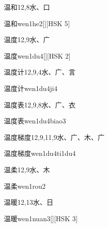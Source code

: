 \begin{entry}{温和}{12,8}{⽔、⼝}
  \begin{phonetics}{温和}{wen1he2}[][HSK 5]
  \end{phonetics}
\end{entry}

\begin{entry}{温度}{12,9}{⽔、⼴}
  \begin{phonetics}{温度}{wen1du4}[][HSK 2]
  \end{phonetics}
\end{entry}

\begin{entry}{温度计}{12,9,4}{⽔、⼴、⾔}
  \begin{phonetics}{温度计}{wen1du4ji4}
  \end{phonetics}
\end{entry}

\begin{entry}{温度表}{12,9,8}{⽔、⼴、⾐}
  \begin{phonetics}{温度表}{wen1du4biao3}
  \end{phonetics}
\end{entry}

\begin{entry}{温度梯度}{12,9,11,9}{⽔、⼴、⽊、⼴}
  \begin{phonetics}{温度梯度}{wen1du4ti1du4}
  \end{phonetics}
\end{entry}

\begin{entry}{温柔}{12,9}{⽔、⽊}
  \begin{phonetics}{温柔}{wen1rou2}
  \end{phonetics}
\end{entry}

\begin{entry}{温暖}{12,13}{⽔、⽇}
  \begin{phonetics}{温暖}{wen1nuan3}[][HSK 3]
  \end{phonetics}
\end{entry}

